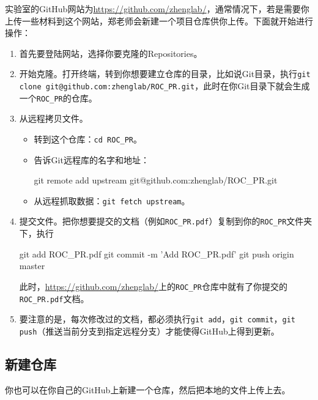 \documentclass[a4paper,12pt]{article}
\begin{document}
实验室的GitHub网站为\url{https://github.com/zhenglab/}，通常情况下，若是需要你上传一些材料到这个网站，郑老师会新建一个项目仓库供你上传。下面就开始进行操作：
\begin{enumerate}
\item 首先要登陆网站，选择你要克隆的Repositories。
\item 开始克隆。打开终端，转到你想要建立仓库的目录，比如说Git目录，执行\lstinline|git clone git@github.com:zhenglab/ROC_PR.git|，此时在你Git目录下就会生成一个\verb|ROC_PR|的仓库。
\item 从远程拷贝文件\cite{6:misc}。
\begin{itemize}
\item 转到这个仓库：\lstinline|cd ROC_PR|。
\item 告诉Git远程库的名字和地址：
\begin{bash}
git remote add upstream git@github.com:zhenglab/ROC_PR.git
\end{bash}
\item 从远程抓取数据：\lstinline|git fetch upstream|。
\end{itemize}
\item 提交文件。把你想要提交的文档（例如\verb|ROC_PR.pdf|）复制到你的\verb|ROC_PR|文件夹下，执行
\begin{bash}
git add ROC_PR.pdf
git commit -m 'Add ROC_PR.pdf'
git push origin master
\end{bash}
此时，\url{https://github.com/zhenglab/}上的\verb|ROC_PR|仓库中就有了你提交的\verb|ROC_PR.pdf|文档。
\item 要注意的是，每次修改过的文档，都必须执行\lstinline|git add|，\lstinline|git commit|，\lstinline|git push|（推送当前分支到指定远程分支）才能使得GitHub上得到更新。
\end{enumerate}

\subsection{新建仓库}

你也可以在你自己的GitHub上新建一个仓库，然后把本地的文件上传上去。
\end{document}
